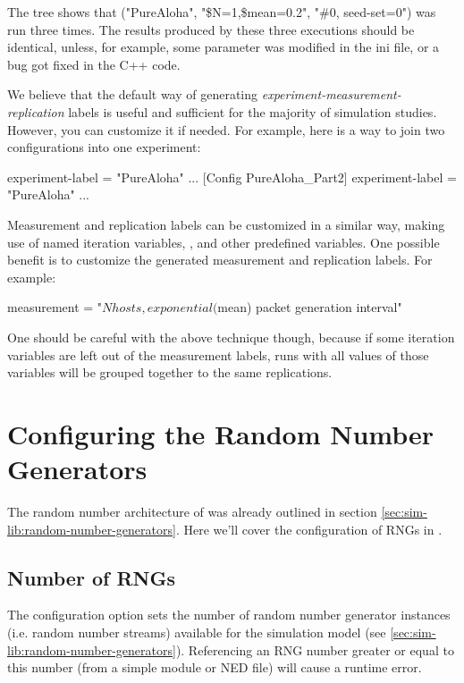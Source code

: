The tree shows that ("PureAloha", "\$N=1,\$mean=0.2", "\#0, seed-set=0")
was run three times. The results produced
by these three executions should be identical, unless, for example,
some parameter was modified in the ini file, or a bug got fixed in the
C++ code.

We believe that the default way of generating
\textit{experiment-measurement-replication} labels is useful and
sufficient for the majority of simulation studies. However, you can
customize it if needed. For example, here is a way to join two
configurations into one experiment:

\begin{inifile}
experiment-label = "PureAloha"
...
[Config PureAloha_Part2]
experiment-label = "PureAloha"
...
\end{inifile}

Measurement and replication labels can be customized in a similar way,
making use of named iteration variables, ,
 and other predefined variables. One possible benefit is
to customize the generated measurement and replication labels. For
example:

\begin{inifile}
measurement = "${N} hosts, exponential(${mean}) packet generation interval"
\end{inifile}

One should be careful with the above technique though, because if some
iteration variables are left out of the measurement labels, runs with
all values of those variables will be grouped together to the same
replications.


\section{Configuring the Random Number Generators}
\label{sec:config-sim:rng-config}

The random number architecture of {\opp} was already outlined
in section \ref{sec:sim-lib:random-number-generators}. Here
we'll cover the configuration of RNGs in .

\subsection{Number of RNGs}
\label{sec:config-sim:number-of-rngs}

The  configuration option sets the number of
random number generator instances (i.e. random number streams)
available for the simulation model (see \ref{sec:sim-lib:random-number-generators}).
Referencing an RNG number greater or equal to this number
(from a simple module or NED file) will cause a runtime error.


